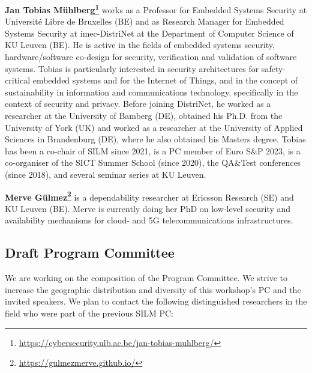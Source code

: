 \documentclass[a4paper,11pt]{article}
\begin{document}
\textbf{Jan Tobias
M\"uhlberg\footnote{\url{https://cybersecurity.ulb.ac.be/jan-tobias-muhlberg/}}}
works as a Professor for Embedded Systems Security at Universit\'e Libre de
Bruxelles (BE) and as Research Manager for Embedded Systems Security at
imec-DistriNet at the Department of Computer Science of KU Leuven (BE). He
is active in the fields of embedded systems security, hardware/software
co-design for security, verification and validation of software systems.
Tobias is particularly interested in security architectures for
safety-critical embedded systems and for the Internet of Things, and in the
concept of sustainability in information and communications technology,
specifically in the context of security and privacy. Before joining
DistriNet, he worked as a researcher at the University of Bamberg (DE),
obtained his Ph.D. from the University of York (UK) and worked as a
researcher at the University of Applied Sciences in Brandenburg (DE), where
he also obtained his Masters degree. Tobias has been a co-chair of SILM
since 2021, is a PC member of Euro S\&P 2023, is a co-organiser of the SICT
Summer School (since 2020), the QA\&Test conferences (since 2018), and
several seminar series at KU Leuven.

\textbf{Merve
G\"ulmez\footnote{\url{https://gulmezmerve.github.io/}}}
is a dependability researcher at Ericsson Research (SE) and KU Leuven (BE).
Merve is currently doing her PhD on low-level security and availability
mechanisms for cloud- and 5G telecommunications infrastructures.


\subsection{Draft Program Committee}
%
We are working on the composition of the Program Committee. We 
strive to increase the geographic distribution and diversity of this
workshop's PC and the invited speakers. We plan to contact the
following distinguished researchers in the field who were part of the previous SILM PC:

\end{document}
